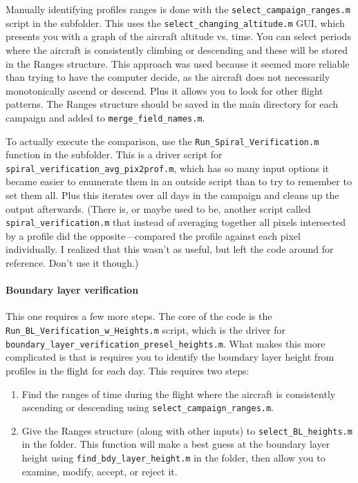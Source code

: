\documentclass[12pt]{article}
\begin{document}
		Manually identifying profiles ranges is done with the \lstinline$select_campaign_ranges.m$ script in the  subfolder. This uses the \lstinline$select_changing_altitude.m$ GUI, which presents you with a graph of the aircraft altitude vs. time. You can select periods where the aircraft is consistently climbing or descending and these will be stored in the Ranges structure. This approach was used because it seemed more reliable than trying to have the computer decide, as the aircraft does not necessarily monotonically ascend or descend. Plus it allows you to look for other flight patterns. The Ranges structure should be saved in the main directory for each campaign and added to \lstinline$merge_field_names.m$.
		
		To actually execute the comparison, use the \lstinline$Run_Spiral_Verification.m$ function in the  subfolder. This is a driver script for \lstinline$spiral_verification_avg_pix2prof.m$, which has so many input options it became easier to enumerate them in an outside script than to try to remember to set them all. Plus this iterates over all days in the campaign and cleans up the output afterwards. (There is, or maybe used to be, another script called \lstinline$spiral_verification.m$ that instead of averaging together all pixels intersected by a profile did the opposite---compared the profile against each pixel individually. I realized that this wasn't as useful, but left the code around for reference. Don't use it though.)
		
		\paragraph{Boundary layer verification}
		
		This one requires a few more steps.  The core of the code is the \lstinline$Run_BL_Verification_w_Heights.m$ script, which is the driver for \lstinline$boundary_layer_verification_presel_heights.m$. What makes this more complicated is that is requires you to identify the boundary layer height from profiles in the flight for each day. This requires two steps:
		
		\begin{enumerate}
		\item Find the ranges of time during the flight where the aircraft is consistently ascending or descending using \lstinline$select_campaign_ranges.m$.
		\item Give the Ranges structure (along with other inputs) to \lstinline$select_BL_heights.m$ in the  folder. This function will make a best guess at the boundary layer height using \lstinline$find_bdy_layer_height.m$ in the  folder, then allow you to examine, modify, accept, or reject it.
		\end{enumerate}
		
\end{document}
